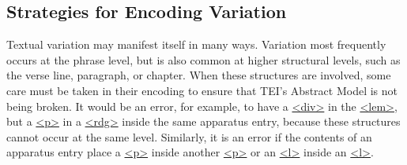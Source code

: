 \subsection[{Strategies for Encoding Variation}]{Strategies for Encoding Variation}\par
Textual variation may manifest itself in many ways. Variation most frequently occurs at the phrase level, but is also common at higher structural levels, such as the verse line, paragraph, or chapter. When these structures are involved, some care must be taken in their encoding to ensure that TEI's Abstract Model is not being broken. It would be an error, for example, to have a \hyperref[TEI.div]{<div>} in the \hyperref[TEI.lem]{<lem>}, but a \hyperref[TEI.p]{<p>} in a \hyperref[TEI.rdg]{<rdg>} inside the same apparatus entry, because these structures cannot occur at the same level. Similarly, it is an error if the contents of an apparatus entry place a \hyperref[TEI.p]{<p>} inside another \hyperref[TEI.p]{<p>} or an \hyperref[TEI.l]{<l>} inside an \hyperref[TEI.l]{<l>}.\par
